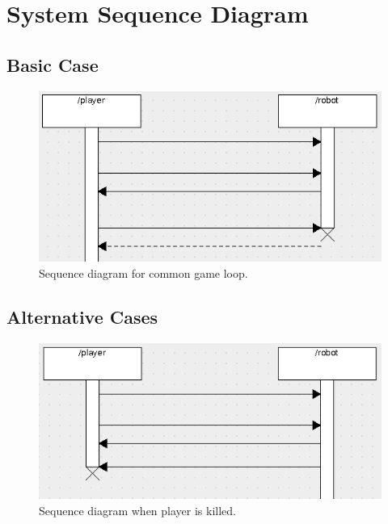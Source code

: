 \documentclass{article}
\begin{document}
\section{System Sequence Diagram}
\subsection{Basic Case}
\begin{figure}[htb]
\centering
\includegraphics[scale=0.5]{basic-sequence}
\caption{Sequence diagram for common game loop.}
\end{figure}
\subsection{Alternative Cases}
\begin{figure}[htb]
\centering
\includegraphics[scale=0.5]{player-dies-sequence}
\caption{Sequence diagram when player is killed.}
\end{figure}
\end{document}
